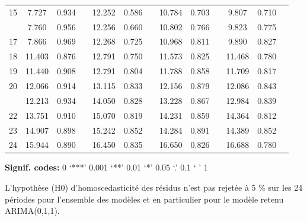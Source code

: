 \documentclass[]{article}
\begin{document}
\begin{table}[!h]
{\begin{threeparttable}
\begin{tabular}[t]{ccccccccccccc}
15 & 7.727 & 0.934 &  & 12.252 & 0.586 &  & 10.784 & 0.703 &  & 9.807 & 0.710 & \\
\addlinespace
16 & 7.760 & 0.956 &  & 12.256 & 0.660 &  & 10.802 & 0.766 &  & 9.823 & 0.775 & \\
17 & 7.866 & 0.969 &  & 12.268 & 0.725 &  & 10.968 & 0.811 &  & 9.890 & 0.827 & \\
18 & 11.403 & 0.876 &  & 12.791 & 0.750 &  & 11.573 & 0.825 &  & 11.468 & 0.780 & \\
19 & 11.440 & 0.908 &  & 12.791 & 0.804 &  & 11.788 & 0.858 &  & 11.709 & 0.817 & \\
20 & 12.066 & 0.914 &  & 13.115 & 0.833 &  & 12.156 & 0.879 &  & 12.086 & 0.843 & \\
\addlinespace
21 & 12.213 & 0.934 &  & 14.050 & 0.828 &  & 13.228 & 0.867 &  & 12.984 & 0.839 & \\
22 & 13.751 & 0.910 &  & 15.070 & 0.819 &  & 14.231 & 0.859 &  & 14.364 & 0.812 & \\
23 & 14.907 & 0.898 &  & 15.242 & 0.852 &  & 14.284 & 0.891 &  & 14.389 & 0.852 & \\
24 & 15.944 & 0.890 &  & 16.450 & 0.835 &  & 16.650 & 0.826 &  & 16.688 & 0.780 & \\
\bottomrule
\end{tabular}
\begin{tablenotes}
\item \hspace{-0.4cm}\textbf{Signif. codes: }0 `***' 0.001 `**' 0.01 `*' 0.05 `.' 0.1 ` ' 1
\item L’hypothèse (H0) d’homoscedasticité des résidus n’est pas rejetée à 5 \% sur les 24 périodes pour l’ensemble des modèles et en particulier pour le modèle retenu ARIMA(0,1,1).
\end{tablenotes}
\end{threeparttable}}
\end{table}
\end{document}
